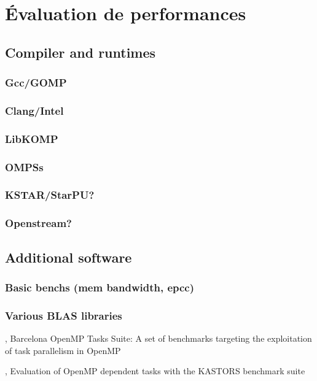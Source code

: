 \chapter{Évaluation de performances}\label{chap:exp:env}
\chaptertoc

\section{Compiler and runtimes}

\subsection{Gcc/GOMP}
\subsection{Clang/Intel}
\subsection{LibKOMP}
\subsection{OMPSs}
\subsection{KSTAR/StarPU?}
\subsection{Openstream?}

\section{Additional software}
\subsection{Basic benchs (mem bandwidth, epcc)}
\subsection{Various BLAS libraries}


%

\cite{Duran2009}, Barcelona OpenMP Tasks Suite: A set of benchmarks targeting the exploitation of task parallelism in OpenMP

\cite{Virouleau2014}, Evaluation of OpenMP dependent tasks with the KASTORS benchmark suite
